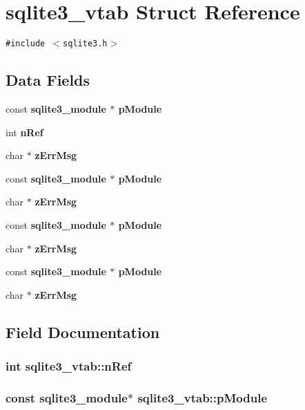 \section{sqlite3\_\-vtab Struct Reference}
\label{structsqlite3__vtab}
{\tt \#include $<$sqlite3.h$>$}

\subsection*{Data Fields}
\begin{CompactItemize}
\item 
const \bf{sqlite3\_\-module} $\ast$ \bf{p\-Module}
\item 
int \bf{n\-Ref}
\item 
char $\ast$ \bf{z\-Err\-Msg}
\item 
const \bf{sqlite3\_\-module} $\ast$ \bf{p\-Module}
\item 
char $\ast$ \bf{z\-Err\-Msg}
\item 
const \bf{sqlite3\_\-module} $\ast$ \bf{p\-Module}
\item 
char $\ast$ \bf{z\-Err\-Msg}
\item 
const \bf{sqlite3\_\-module} $\ast$ \bf{p\-Module}
\item 
char $\ast$ \bf{z\-Err\-Msg}
\end{CompactItemize}


\subsection{Field Documentation}
\subsubsection{\setlength{\rightskip}{0pt plus 5cm}int \bf{sqlite3\_\-vtab::n\-Ref}}\label{structsqlite3__vtab_1b42dea298ef3154c959ef0aac2797ca}


\subsubsection{\setlength{\rightskip}{0pt plus 5cm}const \bf{sqlite3\_\-module}$\ast$ \bf{sqlite3\_\-vtab::p\-Module}}\label{structsqlite3__vtab_ff18af43c781a9883c34a34265479cd4}


